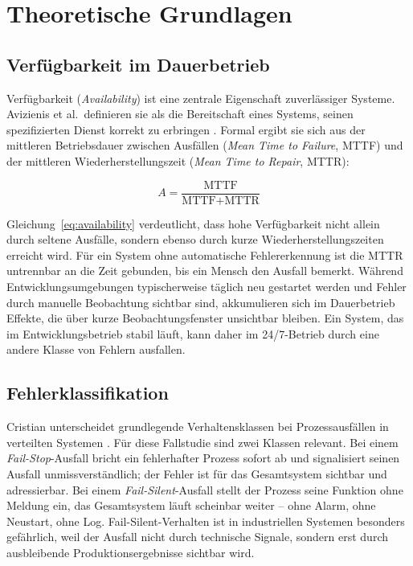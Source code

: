 
\section{Theoretische Grundlagen}
\label{sec:grundlagen}

\subsection{Verfügbarkeit im Dauerbetrieb}
\label{sec:grundlagen-verfuegbarkeit}

Verfügbarkeit (\textit{Availability}) ist eine zentrale Eigenschaft zuverlässiger
Systeme. Avizienis et al.\ definieren sie als die Bereitschaft eines Systems, seinen
spezifizierten Dienst korrekt zu erbringen \cite{avizienis2004}. Formal ergibt sie sich
aus der mittleren Betriebsdauer zwischen Ausfällen (\textit{Mean Time to Failure}, MTTF)
und der mittleren Wiederherstellungszeit (\textit{Mean Time to Repair}, MTTR):

\begin{equation}
    A = \frac{\text{MTTF}}{\text{MTTF} + \text{MTTR}}
    \label{eq:availability}
\end{equation}

Gleichung~\ref{eq:availability} verdeutlicht, dass hohe Verfügbarkeit nicht allein durch
seltene Ausfälle, sondern ebenso durch kurze Wiederherstellungszeiten erreicht wird. Für
ein System ohne automatische Fehlererkennung ist die MTTR untrennbar an die Zeit
gebunden, bis ein Mensch den Ausfall bemerkt. Während Entwicklungsumgebungen typischerweise
täglich neu gestartet werden und Fehler durch manuelle Beobachtung sichtbar sind,
akkumulieren sich im Dauerbetrieb Effekte, die über kurze Beobachtungsfenster unsichtbar
bleiben. Ein System, das im Entwicklungsbetrieb stabil läuft, kann daher im 24/7-Betrieb
durch eine andere Klasse von Fehlern ausfallen.

\subsection{Fehlerklassifikation}
\label{sec:grundlagen-fehler}

Cristian unterscheidet grundlegende Verhaltensklassen bei Prozessausfällen in verteilten
Systemen \cite{cristian1991}. Für diese Fallstudie sind zwei Klassen relevant. Bei einem
\textit{Fail-Stop}-Ausfall bricht ein fehlerhafter Prozess sofort ab und signalisiert
seinen Ausfall unmissverständlich; der Fehler ist für das Gesamtsystem sichtbar und
adressierbar. Bei einem \textit{Fail-Silent}-Ausfall stellt der Prozess seine Funktion
ohne Meldung ein, das Gesamtsystem läuft scheinbar weiter -- ohne Alarm, ohne Neustart,
ohne Log. Fail-Silent-Verhalten ist in industriellen Systemen besonders gefährlich, weil
der Ausfall nicht durch technische Signale, sondern erst durch ausbleibende
Produktionsergebnisse sichtbar wird.

